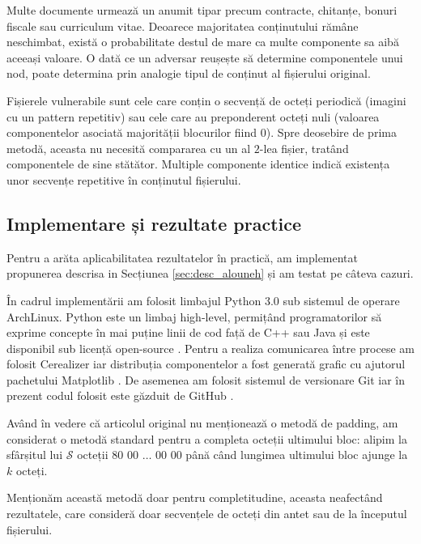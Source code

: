 \documentclass[oneside, 12pt]{book}
\begin{document}
Multe documente urmează un anumit tipar precum contracte, chitanțe, bonuri fiscale sau curriculum vitae. Deoarece majoritatea conținutului rămâne neschimbat, există o probabilitate destul de mare ca multe componente sa aibă aceeași valoare. O dată ce un adversar reușește să determine componentele unui nod, poate determina prin analogie tipul de conținut al fișierului original.

Fișierele vulnerabile sunt cele care conțin o secvență de octeți periodică (imagini cu un pattern repetitiv) sau cele care au preponderent octeți nuli (valoarea componentelor asociată majorității blocurilor fiind $0$). Spre deosebire de prima metodă, aceasta nu necesită compararea cu un al $2$-lea fișier, tratând componentele de sine stătător. Multiple componente identice indică existența unor secvențe repetitive în conținutul fișierului.



\subsection{Implementare și rezultate practice}
Pentru a arăta aplicabilitatea rezultatelor în practică, am implementat propunerea descrisa in Secțiunea {\ref{sec:desc_alouneh}} și am testat pe câteva cazuri.

În cadrul implementării am folosit limbajul Python 3.0 sub sistemul de operare ArchLinux. Python este un limbaj high-level, permițând programatorilor să exprime concepte în mai puține linii de cod față de C++ sau Java și este disponibil sub licență open-source \cite{Python:2015}.
Pentru a realiza comunicarea între procese am folosit Cerealizer iar distribuția componentelor a fost generată grafic cu ajutorul pachetului Matplotlib \cite{Hunter:2007, PyCerealizer:2015}. De asemenea am folosit sistemul de versionare Git iar în prezent codul folosit este găzduit de GitHub \cite{Github:2015, CodeGit:2015}.

Având în vedere că articolul original nu menționează o metodă de padding, am considerat o metodă standard pentru a completa octeții ultimului bloc: alipim la sfârșitul lui $\mathcal{S}$ octeții $80$ $00$ $\dots$ $00$ $00$ până când lungimea ultimului bloc ajunge la $k$ octeți.

Menționăm această metodă doar pentru completitudine, aceasta neafectând rezultatele, care consideră doar secvențele de octeți din antet sau de la începutul fișierului.
\end{document}

